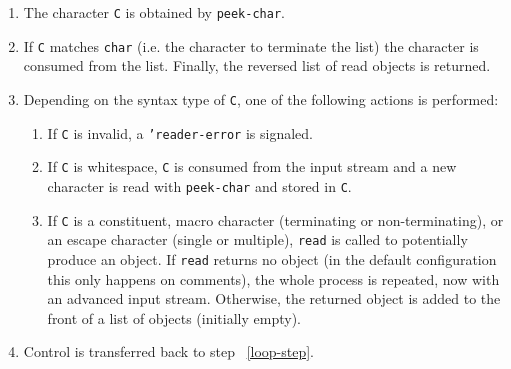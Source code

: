 \documentclass[a4paper,10pt,twoside]{report}
\newcommand{\sym}[1]{\texttt{#1}}
\newcommand{\fun}[1]{\texttt{#1}}
\newcommand{\Read}{\fun{read}}
\begin{document}
\begin{enumerate}
\item The character \sym{C} is obtained by \fun{peek-char}.
\item \label{loop-step}
  If \sym{C} matches \sym{char} (i.e. the character to terminate the list)
  the character is consumed from the list.  Finally, the reversed list of read
  objects is returned.
\item Depending on the syntax type of \sym{C}, one of the following actions is
  performed:
  \begin{enumerate}
  \item If \sym{C} is invalid, a \sym{'reader-error} is signaled.
  \item If \sym{C} is whitespace, \sym{C} is consumed from the input stream and
    a new character is read with \fun{peek-char} and stored in
    \sym{C}.
  \item If \sym{C} is a constituent, macro character (terminating or
    non-terminating), or an escape character (single or multiple), \Read{} is
    called to potentially produce an object.  If \Read{} returns no object (in
    the default configuration this only happens on comments), the whole process
    is repeated, now with an advanced input stream.  Otherwise, the returned
    object is added to the front of a list of objects (initially empty).
  \end{enumerate}
\item Control is transferred back to step ~\ref{loop-step}.
\end{enumerate}
\end{document}
